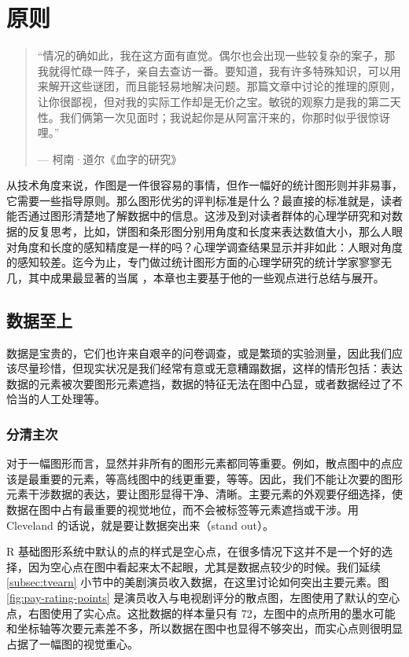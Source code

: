 \documentclass[
  b5paper,
  UTF8,twoside]{book}
\begin{document}
\chapter{原则}\label{chap:principle}

\begin{quote}
``情况的确如此，我在这方面有直觉。偶尔也会出现一些较复杂的案子，那我就得忙碌一阵子，亲自去查访一番。要知道，我有许多特殊知识，可以用来解开这些谜团，而且能轻易地解决问题。那篇文章中讨论的推理的原则，让你很鄙视，但对我的实际工作却是无价之宝。敏锐的观察力是我的第二天性。我们俩第一次见面时；我说起你是从阿富汗来的，你那时似乎很惊讶哩。''

\hspace*{\fill} --- 柯南·道尔《血字的研究》
\end{quote}

从技术角度来说，作图是一件很容易的事情，但作一幅好的统计图形则并非易事，它需要一些指导原则。那么图形优劣的评判标准是什么？最直接的标准就是，读者能否通过图形清楚地了解数据中的信息。这涉及到对读者群体的心理学研究和对数据的反复思考，比如，饼图和条形图分别用角度和长度来表达数值大小，那么人眼对角度和长度的感知精度是一样的吗？心理学调查结果显示并非如此：人眼对角度的感知较差。迄今为止，专门做过统计图形方面的心理学研究的统计学家寥寥无几，其中成果最显著的当属 \citet{Cleveland85} ，本章也主要基于他的一些观点进行总结与展开。

\section{数据至上}\label{sec:data-priority}

数据是宝贵的，它们也许来自艰辛的问卷调查，或是繁琐的实验测量，因此我们应该尽量珍惜，但现实状况是我们经常有意或无意糟蹋数据，这样的情形包括：表达数据的元素被次要图形元素遮挡，数据的特征无法在图中凸显，或者数据经过了不恰当的人工处理等。

\subsection{分清主次}\label{subsec:element-priority}

对于一幅图形而言，显然并非所有的图形元素都同等重要。例如，散点图中的点应该是最重要的元素，等高线图中的线更重要，等等。因此，我们不能让次要的图形元素干涉数据的表达，要让图形显得干净、清晰。主要元素的外观要仔细选择，使数据在图中占有最重要的视觉地位，而不会被标签等元素遮挡或干涉。用 Cleveland 的话说，就是要让数据突出来（stand out）。

R 基础图形系统中默认的点的样式是空心点，在很多情况下这并不是一个好的选择，因为空心点在图中看起来太不起眼，尤其是数据点较少的时候。我们延续 \ref{subsec:tvearn} 小节中的美剧演员收入数据，在这里讨论如何突出主要元素。图 \ref{fig:pay-rating-points} 是演员收入与电视剧评分的散点图，左图使用了默认的空心点，右图使用了实心点。这批数据的样本量只有 72，左图中的点所用的墨水可能和坐标轴等次要元素差不多，所以数据在图中也显得不够突出，而实心点则很明显占据了一幅图的视觉重心。
\end{document}
